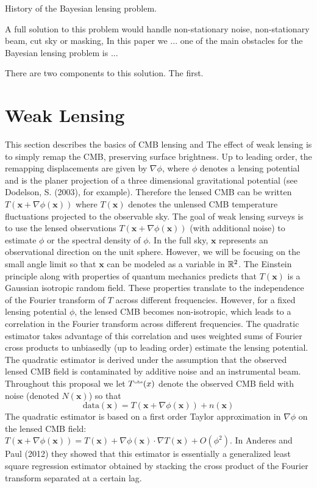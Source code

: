 \documentclass[noinfoline]{imsart}
\newcommand{\bx}{\boldsymbol x}
\begin{document}
History of the Bayesian lensing problem.

A full solution to this problem would handle non-stationary noise, non-stationary beam, cut sky or masking, In this paper we ... one of the main obstacles for the Bayesian lensing problem is ...

There are two components to this solution. The first.

\section{Weak Lensing}

This section describes the  basics of CMB lensing and 
 The effect of weak lensing is to simply remap the CMB, preserving surface brightness.   Up to leading order, the remapping  displacements are given by $\nabla \phi$, where $\phi$ denotes a lensing potential and is the planer projection of a three dimensional gravitational potential (see Dodelson, S. (2003), for example). Therefore the lensed CMB can  be written $T(\bx + \nabla \phi(\bx))$ where $T(\bx)$ denotes the unlensed CMB temperature fluctuations projected to the observable sky.
The goal of weak lensing surveys is to use the lensed observations $T(\bx + \nabla \phi(\bx))$  (with additional noise) to  estimate $\phi$ or the spectral density of $\phi$. 
 In the full sky, $\bx$ represents an observational direction on the unit sphere. However, we will be focusing on the small angle limit  so that $\bx$ can be modeled as a variable in $ \Bbb R^2$.  The Einstein principle along with properties of quantum mechanics predicts that $T(\bx)$   is a Gaussian  isotropic random field. These properties translate to  the independence of the Fourier transform of $T$ across different frequencies.
 However, for a fixed lensing potential $\phi$, the lensed CMB  becomes non-isotropic, which leads to a correlation in the Fourier transform across different frequencies. The quadratic estimator   takes advantage of this correlation and uses weighted sums of Fourier  cross products to unbiasedly (up to leading order) estimate the lensing potential.
The quadratic estimator is derived under the assumption that the observed lensed CMB field is contaminated by additive noise and an instrumental beam. Throughout this proposal we let  $T^\text{\tiny obs}(x)$ denote the observed CMB field  with  noise (denoted $N(\bx)$) so that  
\[ \text{data}(\bx)= T(\bx + \nabla \phi(\bx))+ n(\bx)
 \]
The quadratic estimator is based on a first order Taylor approximation in $\nabla \phi $ on the lensed CMB field:
$T(\bx+\nabla \phi(\bx))= T(\bx) + \nabla \phi(\bx)\cdot \nabla T(\bx)+ O(\phi^2)$. 
In Anderes and Paul (2012) they showed that this estimator is essentially  a generalized least square regression estimator obtained by stacking the cross product of the Fourier transform separated at a certain lag.
\end{document}
